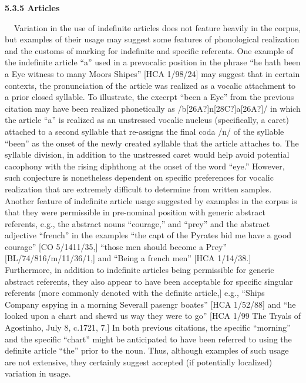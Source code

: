 \documentclass[12pt]{article}
\newcommand\textstylepron[1]{#1}
\newenvironment{styleStandard}{\renewcommand\baselinestretch{1.0}\setlength\leftskip{0cm}\setlength\rightskip{0cm plus 1fil}\setlength\parindent{0cm}\setlength\parfillskip{0pt plus 1fil}\setlength\parskip{0in plus 1pt}\writerlistparindent\writerlistleftskip\leavevmode\normalfont\normalsize\writerlistlabel\ignorespaces}{\unskip\vspace{0in plus 1pt}\par}
\newcommand\writerlistleftskip{}
\newcommand\writerlistparindent{}
\newcommand\writerlistlabel{}
\begin{document}
\begin{styleStandard}
\textbf{5.3.5 Articles}
\end{styleStandard}


\begin{styleStandard}
\textbf{\ \ }Variation in the use of indefinite articles does not feature heavily in the corpus, but examples of their usage may suggest some features of phonological realization and the customs of marking for indefinite and specific referents. One example of the indefinite article “a” used in a prevocalic position in the phrase “he hath been a Eye witness to many Moors Shipes” [HCA 1/98/24] may suggest that in certain contexts, the pronunciation of the article was realized as a vocalic attachment to a prior closed syllable. To illustrate, the excerpt “been a Eye” from the previous citation may have been realized phonetically as /b\textstylepron{[26A?]}n[28C?]\textstylepron{a[26A?]/ in which the article “a” is realized as an unstressed vocalic nucleus (specifically, a caret) attached to a second syllable that re-assigns the final coda /n/ of the syllable “been” as the onset of the newly created syllable that the article attaches to. The syllable division, in addition to the unstressed caret would help avoid potential cacophony with the rising diphthong at the onset of the word “eye.” However, such conjecture is nonetheless dependent on specific preferences for vocalic realization that are extremely difficult to determine from written samples. Another feature of indefinite article usage suggested by examples in the corpus is that they were permissible in pre-nominal position with generic abstract referents, e.g., the abstract nouns “courage,” and “prey” and the abstract adjective “french” in the examples }“the capt of the Pyrates bid me have a good courage” [CO 5/1411/35,] “those men should become a Prey” [BL/74/816/m/11/36/1,] and “Being a french men” [HCA 1/14/38.] Furthermore, in addition to indefinite articles being \textstylepron{permissible for generic abstract referents, they also appear to have been acceptable for specific singular referents (more commonly denoted with the definite article,] e.g., }“Ships Company espying in a morning Severall pasengr boates” [HCA 1/52/88] and “he looked upon a chart and shewd us way they were to go” [HCA 1/99 The Tryals of Agostinho, July 8, c.1721, 7.] In both previous citations, the specific “morning” and the specific “chart” might be anticipated to have been referred to using the definite article “the” prior to the noun. Thus, although examples of such usage are not extensive, they certainly suggest accepted (if potentially localized) variation in usage. 
\end{styleStandard}
\end{document}
